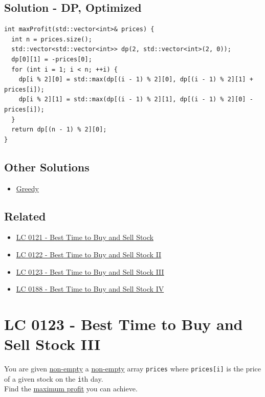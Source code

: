 \subsection*{Solution - DP, Optimized}
\begin{lstlisting}
int maxProfit(std::vector<int>& prices) {
  int n = prices.size();
  std::vector<std::vector<int>> dp(2, std::vector<int>(2, 0));
  dp[0][1] = -prices[0];
  for (int i = 1; i < n; ++i) {
    dp[i % 2][0] = std::max(dp[(i - 1) % 2][0], dp[(i - 1) % 2][1] + prices[i]);
    dp[i % 2][1] = std::max(dp[(i - 1) % 2][1], dp[(i - 1) % 2][0] - prices[i]);
  }
  return dp[(n - 1) % 2][0];
}
\end{lstlisting}

\subsection*{Other Solutions}
\begin{itemize}
\item \hyperref[solution:lc0122_greedy]{Greedy}
\end{itemize}

\subsection*{Related}
\begin{itemize}
	\item \hyperref[lc0121]{LC 0121 - Best Time to Buy and Sell Stock}
	\item \hyperref[lc0122]{LC 0122 - Best Time to Buy and Sell Stock II}
	\item \hyperref[lc0123]{LC 0123 - Best Time to Buy and Sell Stock III}
	\item \hyperref[lc0188]{LC 0188 - Best Time to Buy and Sell Stock IV}
\end{itemize}

\section{LC 0123 - Best Time to Buy and Sell Stock III}\label{lc0123}
You are given \ul{non-empty} a \ul{non-empty} array {\colorbox{CodeBackground}{\lstinline|prices|}} where {\colorbox{CodeBackground}{\lstinline|prices[i]|}} is the price of a given stock on the {\colorbox{CodeBackground}{\lstinline|i|}}th day.\\

Find the \ul{maximum profit} you can achieve. \\

